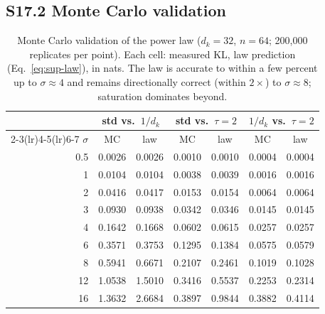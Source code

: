 \documentclass[10pt,a4paper]{article}
\newcommand{\dk}{d_k}
\begin{document}
\subsection*{S17.2 Monte Carlo validation}
\begin{table}[H]
  \centering
  \caption{Monte Carlo validation of the power law ($d_k = 32$, $n = 64$;
  200{,}000 replicates per point). Each cell: measured KL, law prediction
  (Eq.~\ref{eq:sup-law}), in nats. The law is accurate to within a few
  percent up to $\sigma \approx 4$ and remains directionally correct (within
  $2\times$) to $\sigma \approx 8$; saturation dominates beyond.}
  \label{tab:s17-mc}
  \small
  \begin{tabular*}{0.9\textwidth}{@{\extracolsep{\fill}} r cc cc cc}
    \toprule
    & \multicolumn{2}{c}{\textbf{std vs.\ $1/\dk$}} &
      \multicolumn{2}{c}{\textbf{std vs.\ $\tau{=}2$}} &
      \multicolumn{2}{c}{\textbf{$1/\dk$ vs.\ $\tau{=}2$}} \\
    \cmidrule(lr){2-3}\cmidrule(lr){4-5}\cmidrule(lr){6-7}
    $\sigma$ & MC & law & MC & law & MC & law \\
    \midrule
    0.5  & 0.0026 & 0.0026 & 0.0010 & 0.0010 & 0.0004 & 0.0004 \\
    1    & 0.0104 & 0.0104 & 0.0038 & 0.0039 & 0.0016 & 0.0016 \\
    2    & 0.0416 & 0.0417 & 0.0153 & 0.0154 & 0.0064 & 0.0064 \\
    3    & 0.0930 & 0.0938 & 0.0342 & 0.0346 & 0.0145 & 0.0145 \\
    4    & 0.1642 & 0.1668 & 0.0602 & 0.0615 & 0.0257 & 0.0257 \\
    6    & 0.3571 & 0.3753 & 0.1295 & 0.1384 & 0.0575 & 0.0579 \\
    8    & 0.5941 & 0.6671 & 0.2107 & 0.2461 & 0.1019 & 0.1028 \\
    12   & 1.0538 & 1.5010 & 0.3416 & 0.5537 & 0.2253 & 0.2314 \\
    16   & 1.3632 & 2.6684 & 0.3897 & 0.9844 & 0.3882 & 0.4114 \\
    \bottomrule
  \end{tabular*}
\end{table}
\end{document}
